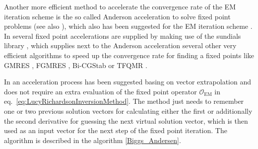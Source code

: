 Another more efficient method to accelerate the convergence rate of the EM iteration scheme is the so called Anderson acceleration \cite{Anderson1965} to solve fixed point problems (see also \cite{Walker2011,Toth2015}), which also has been suggested for the EM iteration scheme \cite{Henderson2019}. In \SASfit several fixed point accelerations are supplied by making use of the sundials library \cite{Hindmarsh2005}, which supplies next to the Anderson acceleration several other very efficient algorithms to speed up the convergence rate for finding a fixed points like GMRES \cite{Saad1986}, FGMRES \cite{Saad1993}, Bi-CGStab \cite{Vorst1992} or TFQMR \cite{Freund1993}. 

In \cite{Biggs1997, Biggs1995} an acceleration process has been suggested basing on vector extrapolation and does not require an extra evaluation of the fixed point operator $\mathcal{O}_\mathrm{EM}$ in eq.\ \ref{eq:LucyRichardsonInversionMethod}. The method just needs to remember one or two previous solution vectors for calculating either the first or additionally the second derivative for guessing the next virtual solution vector, which is then used as an input vector for the next step of the fixed point iteration. The algorithm is described in the algorithm \ref{Biggs_Andersen}.
